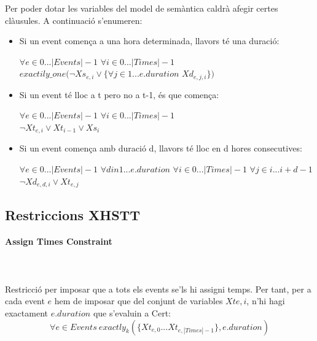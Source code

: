 \documentclass[11pt,a4paper,twoside]{report}
\begin{document}
  Per poder dotar les variables del model de semàntica caldrà afegir certes clàusules. A continuació s'enumeren:
  \begin{itemize}
    \item Si un event comença a una hora determinada, llavors té una duració: \begin{center} $\forall e \in 0 ... |Events|-1$ $\forall i \in 0 ... |Times|-1$ \\$exactily\_one(\neg Xs_{e,i} \vee \{ \forall j \in 1 ... e.duration$ $Xd_{e,j,i}\})$\end{center}
    \item Si un event té lloc a t pero no a t-1, és que comença: \begin{center} $\forall e \in 0 ... |Events|-1$ $\forall i \in 0 ... |Times|-1$ \\$\neg Xt_{e,i} \vee Xt_{i-1} \vee Xs_i$ \end{center}
    \item Si un event comença amb duració d, llavors té lloc en d hores consecutives: \begin{center} 
      $\forall e \in 0 ... |Events|-1$ $\forall d in 1 ... e.duration$ $\forall i \in 0 ... |Times|-1$ $\forall j \in i ... i+d-1$ \\
      $\neg Xd_{e,d,i} \vee Xt_{e,j}$
    
    \end{center}
  \end{itemize}

  \subsection{Restriccions XHSTT}
  \paragraph*{Assign Times Constraint} ~\\~\\
  Restricció per imposar que a tots els events se'ls hi assigni temps. Per tant, per a cada event $e$ hem de imposar que del conjunt de variables $Xt{e,i}$, n'hi hagi exactament $e.duration$ que s'evaluin a Cert:
  \[
    \forall e \in Events \ exactly_k(\{Xt_{e,0} ... Xt_{e,|Times|-1}\}, e.duration)
  \]
\end{document}
